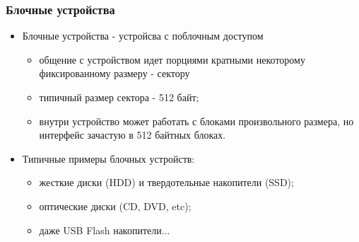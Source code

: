 \begin{frame}
\frametitle{Блочные устройства}
\begin{itemize}
  \item Блочные устройства - устройсва с поблочным доступом
  \begin{itemize}
    \item общение с устройством идет порциями кратными некоторому фиксированному
    размеру - сектору
    \item типичный размер сектора - 512 байт;
    \item внутри устройство может работать с блоками произвольного размера, но
    интерфейс зачастую в 512 байтных блоках.
  \end{itemize}
  \item Типичные примеры блочных устройств:
  \begin{itemize}
    \item жесткие диски (HDD) и твердотельные накопители (SSD);
    \item оптические диски (CD, DVD, etc);
    \item даже USB Flash накопители...
  \end{itemize}
\end{itemize}
\end{frame}
